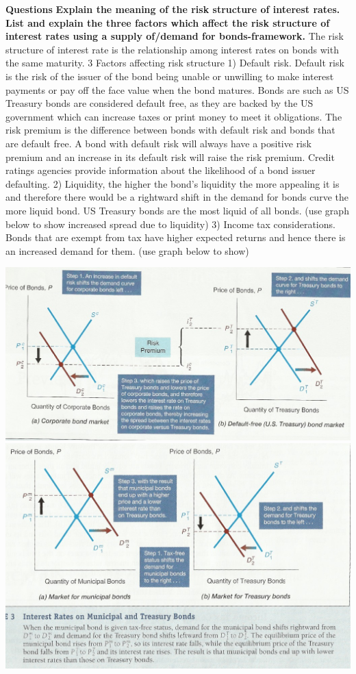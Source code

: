 \documentclass[12pt]{examnotes}
\begin{document}
\textbf{Questions}
\textbf{Explain the meaning of the risk structure of interest rates. List and explain the three factors which affect the risk structure of interest rates using a supply of/demand for bonds-framework.}
The risk structure of interest rate is the relationship among interest rates on bonds with the same maturity.
3 Factors affecting risk structure 1) Default risk. Default risk is the risk of the issuer of the bond being unable or unwilling to make interest payments or pay off the face value when the bond matures.  Bonds are such as US Treasury bonds are considered default free, as they are backed by the US government which can increase taxes or print money to meet it obligations. The risk premium is the difference between bonds with default risk and bonds that are default free. A bond with default risk will always have a positive risk premium and an increase in its default risk will raise the risk premium. Credit ratings agencies provide information about the likelihood of a bond issuer defaulting. 
2) Liquidity, the higher the bond's liquidity the more appealing it is and therefore there would be a rightward shift in the demand for bonds curve the more liquid bond. US Treasury bonds are the most liquid of all bonds. (use graph below to show increased spread due to liquidity) 3) Income tax considerations. Bonds that are exempt from tax have higher expected returns and hence there is an increased demand for them. (use graph below to show)
\begin{center}
  \includegraphics[scale=0.45]{./imgs/c6f2.jpg}
  \includegraphics[scale=0.4]{./imgs/c6f3.jpg}
\end{center}
\end{document}
